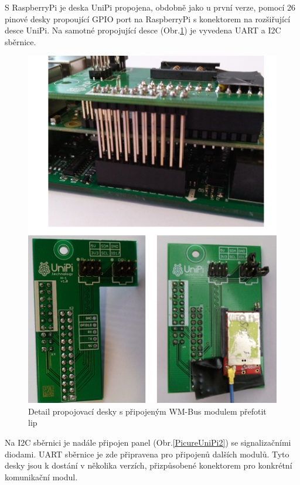 S RaspberryPi je deska UniPi propojena, obdobně jako u první verze, pomocí 26 pinové desky propoující GPIO port na RaspberryPi s konektorem na rozšiřující desce UniPi. Na samotné propojující desce (Obr.\ref{PicureUniPi1}) je vyvedena UART a I2C sběrnice. 

 \begin{figure}[!h]
  \begin{center}
    \includegraphics[scale=0.70]{obrazky/unipi_propojbrain}
  \end{center}
	\label{PicureUniPi1}
  \caption{Detail propojovací desky s připojeným WM-Bus modulem \colorbox[rgb]{0,1,0}{přefotit lip}}
\end{figure}

Na I2C sběrnici je nadále připojen panel (Obr.\ref{PicureUniPi2}) se signalizačními diodami. UART sběrnice je zde připravena pro připojenů dalších modulů. Tyto desky jsou k dostání v několika verzích, přizpůsobené konektorem pro konkrétní komunikační modul.

